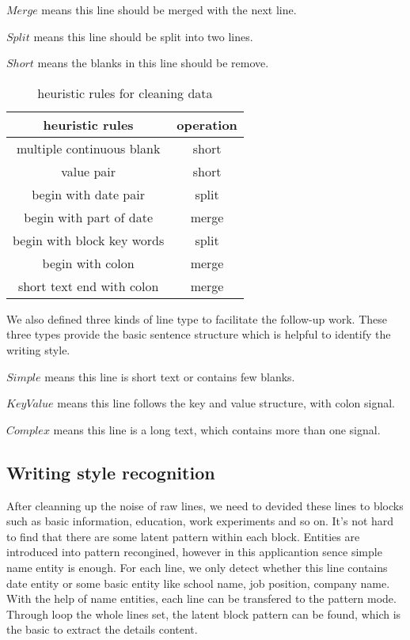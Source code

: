 \documentclass{acm_proc_article-sp}
\begin{document}
$Merge$ means this line should be merged with the next line. 

$Split$ means this line should be split into two lines.

$Short$ means the blanks in this line should be remove. 

\begin{table}
\centering
\caption{heuristic rules for cleaning data}
\begin{tabular}{|c|c|} \hline
heuristic rules & operation\\ \hline
multiple continuous blank & short \\ \hline
value pair & short \\ \hline
begin with date pair & split\\ \hline
begin with part of date & merge \\ \hline
begin with block key words & split \\ \hline
begin with colon & merge\\ \hline
short text end with colon & merge \\
\hline\end{tabular}
\end{table}

We also defined three kinds of line type to facilitate the follow-up work. These three types provide the basic sentence structure which is helpful to identify the writing style.

$Simple$ means this line is short text or contains few blanks. 

$KeyValue$ means this line follows the key and value structure, with colon signal.  

$Complex$ means this line is a long text, which contains more than one signal. 

\subsection{Writing style recognition}

After cleanning up the noise of raw lines, we need to devided these lines to blocks such as basic information, education, work experiments and so on. 
It's not hard to find that there are some latent pattern within each block.
Entities are introduced into pattern recongined, however in this applicantion sence simple name entity is enough.
For each line, we only detect whether this line contains date entity or some basic entity like school name, job position, company name.
With the help of name entities, each line can be transfered to the pattern mode.
Through loop the whole lines set, the latent block pattern can be found, which is the basic to extract the details content.
\end{document}
